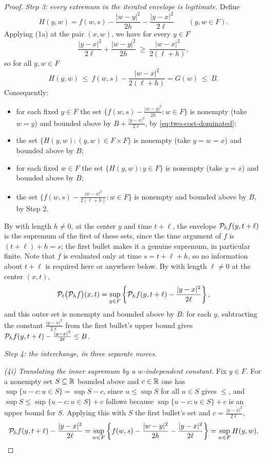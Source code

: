 \begin{proof}
\emph{Step 3: every extremum in the iterated envelope is legitimate.}
Define
\[
  H(y,w)=f(w,s)-\frac{|w-y|^2}{2h}-\frac{|y-x|^2}{2\ell}
  \qquad(y,w\in F).
\]
Applying (1a) at the pair $(x,w)$, we have for every $y\in F$
\[
  \frac{|y-x|^2}{2\ell}+\frac{|w-y|^2}{2h}\ \ge\ \frac{|w-x|^2}{2(\ell+h)} ,
\]
so for all $y,w\in F$
\begin{equation}\label{eq:two-cost-dominated}
  H(y,w)\ \le\ f(w,s)-\frac{|w-x|^2}{2(\ell+h)}=G(w)\ \le\ B .
\end{equation}
Consequently:
\begin{itemize}
\item for each fixed $y\in F$ the set
$\bigl\{f(w,s)-\frac{|w-y|^2}{2h}:w\in F\bigr\}$ is nonempty (take $w=y$) and
bounded above by $B+\frac{|y-x|^2}{2\ell}$, by \eqref{eq:two-cost-dominated};
\item the set $\{H(y,w):(y,w)\in F\times F\}$ is nonempty (take $y=w=x$) and
bounded above by $B$;
\item for each fixed $w\in F$ the set $\{H(y,w):y\in F\}$ is nonempty (take
$y=x$) and bounded above by $B$;
\item the set $\bigl\{f(w,s)-\frac{|w-x|^2}{2(\ell+h)}:w\in F\bigr\}$ is
nonempty and bounded above by $B$, by Step 2.
\end{itemize}
By  with length $h\ne0$, at the center $y$ and time
$t+\ell$, the envelope $\mathcal{P}_hf(y,t+\ell)$ is the supremum of the first of
these sets, since the time argument of $f$ is $(t+\ell)+h=s$; the first bullet
makes it a genuine supremum, in particular finite. Note that $f$ is evaluated
only at time $s=t+\ell+h$, so no information about $t+\ell$ is required here or
anywhere below. By  with length $\ell\ne0$ at the center
$(x,t)$,
\begin{equation}\label{eq:outer-envelope}
  \mathcal{P}_\ell\bigl(\mathcal{P}_hf\bigr)(x,t)
   =\sup_{y\in F}\left\{\mathcal{P}_hf(y,t+\ell)-\frac{|y-x|^2}{2\ell}\right\},
\end{equation}
and this outer set is nonempty and bounded above by $B$: for each $y$,
subtracting the constant $\frac{|y-x|^2}{2\ell}$ from the first bullet's upper
bound gives $\mathcal{P}_hf(y,t+\ell)-\frac{|y-x|^2}{2\ell}\le B$.

\emph{Step 4: the interchange, in three separate moves.}

\emph{(4i) Translating the inner supremum by a $w$-independent constant.} Fix
$y\in F$. For a nonempty set $S\subseteq\mathbb{R}$ bounded above and $c\in\mathbb{R}$ one has
$\sup\{u-c:u\in S\}=\sup S-c$, since $u\le\sup S$ for all $u\in S$ gives
$\le$, and $\sup S\le\sup\{u-c:u\in S\}+c$ follows because
$\sup\{u-c:u\in S\}+c$ is an upper bound for $S$. Applying this with $S$ the
first bullet's set and $c=\frac{|y-x|^2}{2\ell}$,
\[
  \mathcal{P}_hf(y,t+\ell)-\frac{|y-x|^2}{2\ell}
   =\sup_{w\in F}\left\{f(w,s)-\frac{|w-y|^2}{2h}
     -\frac{|y-x|^2}{2\ell}\right\}
   =\sup_{w\in F}H(y,w).
\]


\end{proof}
